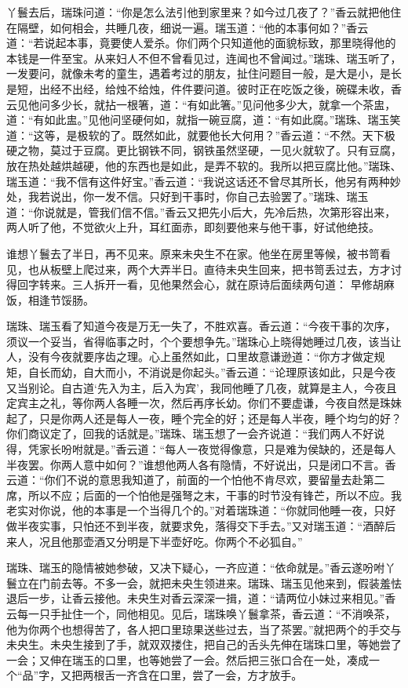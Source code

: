 \documentclass[a4paper,12pt,UTF8,twoside]{ctexbook}
\begin{document}
丫鬟去后，瑞珠问道：“你是怎么法引他到家里来？如今过几夜了？”香云就把他住在隔壁，如何相会，共睡几夜，细说一遍。瑞玉道：“他的本事何如？”香云道：“若说起本事，竟要使人爱杀。你们两个只知道他的面貌标致，那里晓得他的本钱是一件至宝。从来妇人不但不曾看见过，连闻也不曾闻过。”瑞珠、瑞玉听了，一发要问，就像未考的童生，遇着考过的朋友，扯住问题目一般，是大是小，是长是短，出经不出经，给烛不给烛，件件要问道。彼时正在吃饭之後，碗碟未收，香云见他问多少长，就拈一根箸，道：“有如此箸。”见问他多少大，就拿一个茶盅，道：“有如此盅。”见他问坚硬何如，就指一碗豆腐，道：“有如此腐。”瑞珠、瑞玉笑道：“这等，是极软的了。既然如此，就要他长大何用？”香云道：“不然。天下极硬之物，莫过于豆腐。更比钢铁不同，钢铁虽然坚硬，一见火就软了。只有豆腐，放在热处越烘越硬，他的东西也是如此，是弄不软的。我所以把豆腐比他。”瑞珠、瑞玉道：“我不信有这件好宝。”香云道：“我说这话还不曾尽其所长，他另有两种妙处，我若说出，你一发不信。只好到干事时，你自己去验罢了。”瑞珠、瑞玉道：“你说就是，管我们信不信。”香云又把先小后大，先冷后热，次第形容出来，两人听了他，不觉欲火上升，耳红面赤，即刻要他来与他干事，好试他绝技。

谁想丫鬟去了半日，再不见来。原来未央生不在家。他坐在房里等候，被书笥看见，也从板壁上爬过来，两个大弄半日。直待未央生回来，把书笥丢过去，方才讨得回字转来。三人拆开一看，见他果然会心，就在原诗后面续两句道：
早修胡麻饭，相逢节馁肠。

瑞珠、瑞玉看了知道今夜是万无一失了，不胜欢喜。香云道：“今夜干事的次序，须议一个妥当，省得临事之时，个个要想争先。”瑞珠心上晓得她睡过几夜，该当让人，没有今夜就要序齿之理。心上虽然如此，口里故意谦逊道：“你方才做定规矩，自长而幼，自大而小，不消说是你起头。”香云道：“论理原该如此，只是今夜又当别论。自古道‘先入为主，后入为宾’，我同他睡了几夜，就算是主人，今夜且定宾主之礼，等你两人各睡一次，然后再序长幼。你们不要虚谦，今夜自然是珠妹起了，只是你两人还是每人一夜，睡个完全的好；还是每人半夜，睡个均匀的好？你们商议定了，回我的话就是。”瑞珠、瑞玉想了一会齐说道：“我们两人不好说得，凭家长吩咐就是。”香云道：“每人一夜觉得像意，只是难为侯缺的，还是每人半夜罢。你两人意中如何？”谁想他两人各有隐情，不好说出，只是闭口不言。香云道：“你们不说的意思我知道了，前面的一个怕他不肯尽欢，要留量去赴第二席，所以不应；后面的一个怕他是强弩之末，干事的时节没有锋芒，所以不应。我老实对你说，他的本事是一个当得几个的。”对着瑞珠道：“你就同他睡一夜，只好做半夜实事，只怕还不到半夜，就要求免，落得交下手去。”又对瑞玉道：“酒醉后来人，况且他那壶酒又分明是下半壶好吃。你两个不必狐自。”

瑞珠、瑞玉的隐情被她参破，又决下疑心，一齐应道：“依命就是。”香云遂吩咐丫鬟立在门前去等。不多一会，就把未央生领进来。瑞珠、瑞玉见他来到，假装羞怯退后一步，让香云接他。未央生对香云深深一揖，道：“请两位小妹过来相见。”香云每一只手扯住一个，同他相见。见后，瑞珠唤丫鬟拿茶，香云道：“不消唤茶，他为你两个也想得苦了，各人把口里琼果送些过去，当了茶罢。”就把两个的手交与未央生。未央生接到了手，就双双搂住，把自己的舌头先伸在瑞珠口里，等她尝了一会；又伸在瑞玉的口里，也等她尝了一会。然后把三张口合在一处，凑成一个“品”字，又把两根舌一齐含在口里，尝了一会，方才放手。
\end{document}
